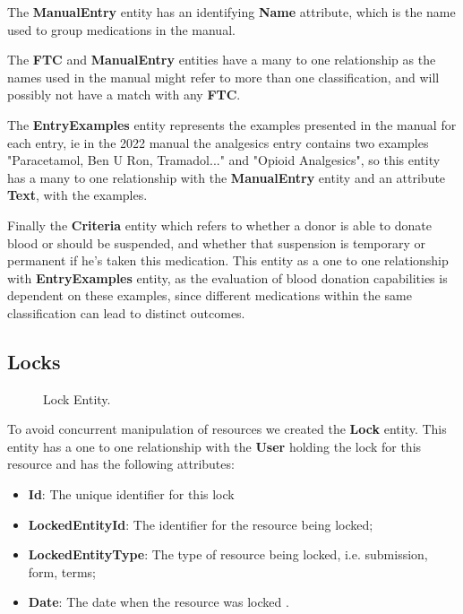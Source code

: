 The \textbf{ManualEntry} entity has an identifying \textbf{Name} attribute, which is the name used to group medications in the manual.

The \textbf{FTC} and \textbf{ManualEntry} entities have a many to one relationship as the names used in the manual might refer to more than one classification, and will possibly not have a match with any \textbf{FTC}.

The \textbf{EntryExamples} entity represents the examples presented in the manual for each entry, ie in the 2022 manual the analgesics entry contains two examples "Paracetamol, Ben U Ron, Tramadol..." and "Opioid Analgesics", so this entity has a many to one relationship with the \textbf{ManualEntry} entity and an attribute \textbf{Text}, with the examples.

Finally the \textbf{Criteria} entity which refers to whether a donor is able to donate blood or should be suspended, and whether that suspension is temporary or permanent if he's taken this medication. This entity as a one to one relationship with \textbf{EntryExamples} entity, as the evaluation of blood donation capabilities is dependent on these examples, since different medications within the same classification can lead to distinct outcomes.

\subsection{Locks}

\begin{figure}[H]
	\begin{center}
	\end{center}
	\caption{Lock Entity.}
\end{figure}

To avoid concurrent manipulation of resources we created the \textbf{Lock} entity. This entity has a
one to one relationship with the \textbf{User} holding the lock for this resource and has the following
attributes:

\begin{itemize}
	\item \textbf{Id}: The unique identifier for this lock
	\item \textbf{LockedEntityId}: The identifier for the resource being locked;
	\item \textbf{LockedEntityType}: The type of resource being locked, i.e. submission, form, terms;
	\item \textbf{Date}: The date when the resource was locked .
\end{itemize}